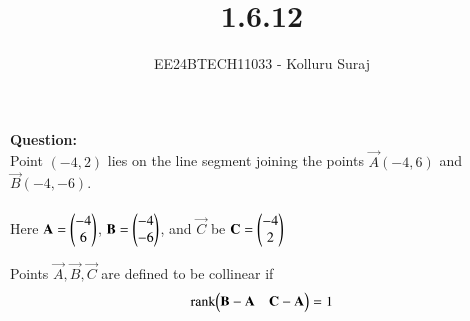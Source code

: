 \documentclass[journal]{IEEEtran}
\begin{document}

\vspace{3cm}

\title{1.6.12}
\author{EE24BTECH11033 - Kolluru Suraj
}
{\let\newpage\relax\maketitle}

\renewcommand{\thefigure}{\theenumi}
\renewcommand{\thetable}{\theenumi}
\setlength{\intextsep}{10pt} %


\renewcommand{\thetable}{\theenumi}
\textbf{Question:}\\
Point $ (-4, 2)$ lies on the line segment joining the points $ \vec{A}(-4, 6)$  and  $\vec{B}(-4, -6)$.
\\
\solution\\
Here $\mathbf{A}=\begin{pmatrix}-4 \\ 6\end{pmatrix}$, $\mathbf{B}=\begin{pmatrix}-4 \\ -6\end{pmatrix}$, and $\vec{C}$ be $\mathbf{C}=\begin{pmatrix}-4 \\ 2\end{pmatrix}$

Points $\vec{A}, \vec{B}, \vec{C}$ are defined to be collinear if 
		\begin{align}
			\label{eq:line-rank-2}
			\text{rank}{\ensuremath{\begin{pmatrix}\mathbf{B}-\mathbf{A}& \mathbf{C}-\mathbf{A}\end{pmatrix}}} = 1
		\end{align}
\end{document}
